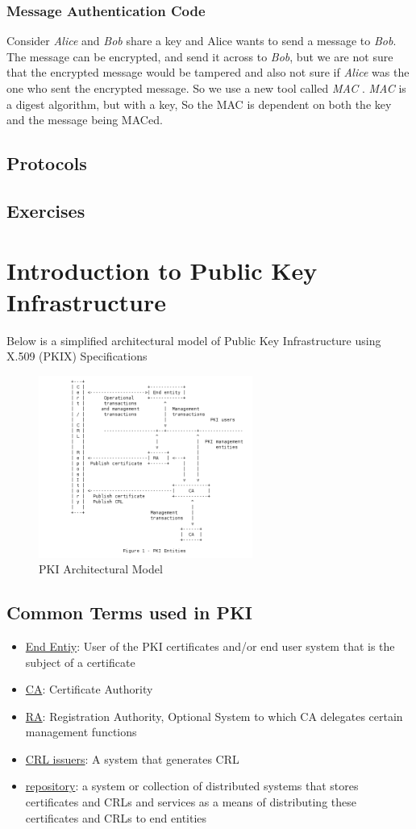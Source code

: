 \documentclass[a4paper]{article}
\begin{document}
\subsubsection{Message Authentication Code}
Consider \textit{Alice} and \textit{Bob} share a key and Alice wants to send a message to \textit{Bob}. The message can be encrypted, 
and send it across to \textit{Bob}, but we are not sure that the encrypted message would be tampered and also not sure 
if \textit{Alice} was the one who sent the encrypted message.  So we use a new tool called \textit{MAC} . \textit{MAC} is a digest algorithm,
but with a key, So the MAC is dependent on both the key and the message being MACed.
\subsection{Protocols}
\subsection{Exercises}
\section{Introduction to Public Key Infrastructure}
Below is a simplified architectural model of Public Key Infrastructure using X.509 (PKIX) Specifications
\begin{figure}[ht!]
    \centering
    \includegraphics[width=70mm]{pki-architectural-model.png}
    \caption{PKI Architectural Model}
\end{figure}
\subsection{Common Terms used in PKI}
\begin{itemize}
    \item \underline{End Entiy}: User of the PKI certificates and/or end user system that is the subject of a certificate
    \item \underline{CA}: Certificate Authority
    \item \underline{RA}: Registration Authority, Optional System to which CA delegates certain management functions
    \item \underline{CRL issuers}: A system that generates CRL
    \item \underline{repository}: a system or collection of distributed systems that stores certificates and CRLs and services as a means of distributing these certificates and CRLs to end entities
\end{itemize}
\end{document}
